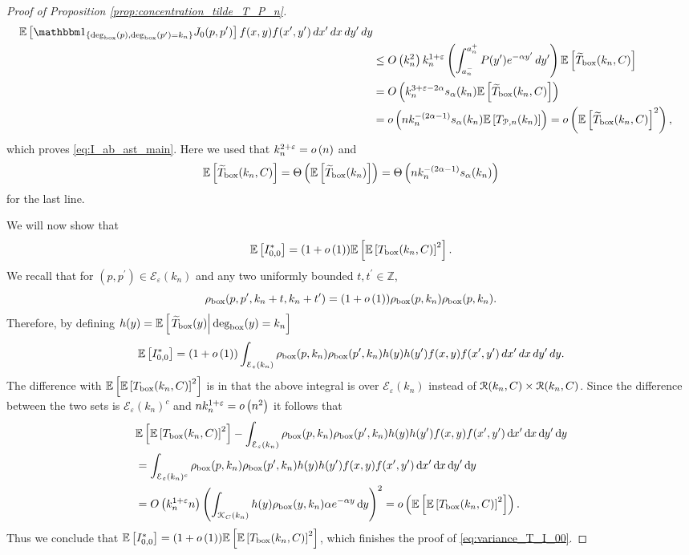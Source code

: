 \begin{proof}[Proof of Proposition \ref{prop:concentration_tilde_T_P_n}]
\begin{align*}
		\Exp{\ind{\Dbox(p), \Dbox(p^\prime) = k_n} J_0(p,p^\prime)} f(x,y) f(x^\prime,y^\prime) \, dx^\prime \, dx \, dy^\prime \, dy\\
	&\le \bigO{k_n^2} k_n^{1+\varepsilon} \left(\int_{a_n^-}^{a_n^+} P(y^\prime) 
		e^{-\alpha y^\prime} \, dy^\prime\right) \Exp{\widetilde{T}_{\text{box}}(k_n,C)}\\
	&= \bigO{k_n^{3 + \varepsilon -2\alpha} s_\alpha(k_n) \Exp{\widetilde{T}_{\text{box}}(k_n,C)}}\\
	&= \smallO{n k_n^{-(2\alpha - 1)}s_\alpha(k_n) \Exp{T_{\Pcal,n}(k_n)}} 
		= \smallO{\Exp{\widetilde{T}_{\text{box}}(k_n,C)}^2},
\end{align*}
which proves \eqref{eq:I_ab_ast_main}. Here we used that $k_n^{2 + \varepsilon} = o\left(n\right)$ and
\[
	\mathbb{E}\left[\widetilde{T}_{\text{box}}(k_n,C)\right] = \Theta\left(\mathbb{E}\left[\widetilde{T}_{\text{box}}(k_n)\right]\right) 
	= \Theta\left(n k_n^{-(2\alpha - 1)}s_\alpha(k_n)\right)
\] 
for the last line.

We will now show that
\[
	\mathbb{E}\left[I^\ast_{0,0}\right] = (1+o\left(1\right))\mathbb{E}\left[\mathbb{E}\left[T_{\text{box}}(k_n,C)\right]^2\right].
\]
We recall that for $(p,p^\prime) \in \mathcal{E}_{\varepsilon}(k_n)$ and any two uniformly bounded $t, t^\prime \in \mathbb{Z}$,
\[
	\rho_{\text{box}}(p,p^\prime,k_n + t,k_n+t^\prime) = (1 + o\left(1\right))\rho_{\text{box}}(p,k_n)\rho_{\text{box}}(p,k_n).
\]
Therefore, by defining $h(y) = \mathbb{E}\left[\left.\widetilde{T}_{\text{box}}(y)\right|\text{deg}_{\text{box}}(y) = k_n\right]$
\[
	\mathbb{E}\left[I_{0,0}^\ast\right] = (1 + o\left(1\right))\int_{\mathcal{E}_{\varepsilon}(k_n)}\rho_{\text{box}}(p,k_n)
		\rho_{\text{box}}(p^\prime,k_n)
		h(y) h(y^\prime) f(x,y)	f(x^\prime,y^\prime) \, dx^\prime \, dx \, dy^\prime \, dy.
\]
The difference with $\mathbb{E}\left[\mathbb{E}\left[T_{\text{box}}(k_n,C)\right]^2\right]$ is in that the above integral is over $\mathcal{E}_\varepsilon(k_n)$ instead of ${\mathcal R}(k_n,C) \times {\mathcal R}(k_n,C)$. Since the difference between the two sets is 
$\mathcal{E}_\varepsilon(k_n)^c$ and $n k_n^{1+\varepsilon} = o\left(n^2\right)$ it follows that
\begin{align*}
	&\mathbb{E}\left[\mathbb{E}\left[T_{\text{box}}(k_n,C)\right]^2\right]
		- \int_{\mathcal{E}_{\varepsilon}(k_n)}\rho_{\text{box}}(p,k_n)\rho_{\text{box}}(p^\prime,k_n)
		h(y) h(y^\prime) f(x,y)	f(x^\prime,y^\prime) \operatorname{\mathrm{d}\hspace{-2pt}} x^\prime \operatorname{\mathrm{d}\hspace{-2pt}} x \operatorname{\mathrm{d}\hspace{-2pt}} y^\prime \operatorname{\mathrm{d}\hspace{-2pt}} y\\
	&= \int_{\mathcal{E}_{\varepsilon}(k_n)^c}\rho_{\text{box}}(p,k_n)\rho_{\text{box}}(p^\prime,k_n)
		h(y) h(y^\prime) f(x,y)	f(x^\prime,y^\prime) \operatorname{\mathrm{d}\hspace{-2pt}} x^\prime \operatorname{\mathrm{d}\hspace{-2pt}} x \operatorname{\mathrm{d}\hspace{-2pt}} y^\prime \operatorname{\mathrm{d}\hspace{-2pt}} y\\
	&= O\left(k_n^{1+\varepsilon}n\right) 
		\left(\int_{{\mathcal K}_{C}(k_n)}h(y)\rho_{\text{box}}(y,k_n)\alpha e^{-\alpha y} \operatorname{\mathrm{d}\hspace{-2pt}} y\right)^2
		= o\left(\mathbb{E}\left[\mathbb{E}\left[T_{\text{box}}(k_n,C)\right]^2\right]\right).
\end{align*}
Thus we conclude that $\mathbb{E}\left[I^\ast_{0,0}\right] = (1+o\left(1\right))\mathbb{E}\left[\mathbb{E}\left[T_{\text{box}}(k_n,C)\right]^2\right]$, which finishes the proof of \eqref{eq:variance_T_I_00}.


\end{proof}
